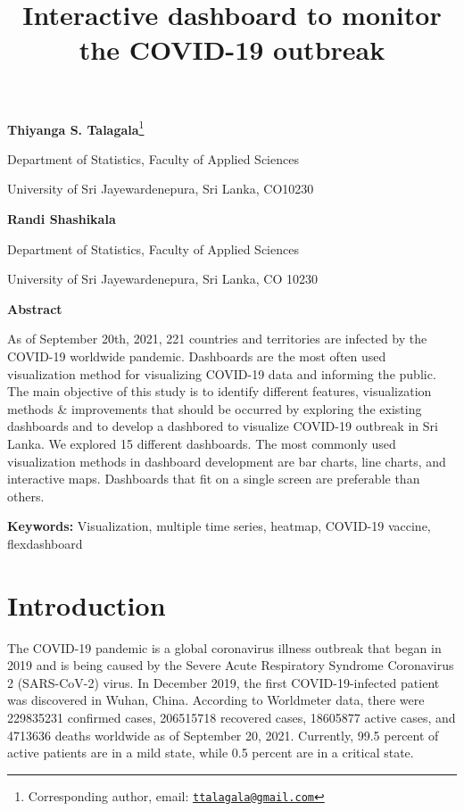 \documentclass[
]{article}
\title{Interactive dashboard to monitor the COVID-19 outbreak}
\author{}
\date{\vspace{-2.5em}}
\begin{document}
\maketitle

\textbf{Thiyanga S. Talagala}\footnote{Corresponding author, email:
  \href{mailto:ttalagala@gmail.com}{\nolinkurl{ttalagala@gmail.com}}}

Department of Statistics, Faculty of Applied Sciences

University of Sri Jayewardenepura, Sri Lanka, CO10230

\hspace{3cm}

\textbf{Randi Shashikala}

Department of Statistics, Faculty of Applied Sciences

University of Sri Jayewardenepura, Sri Lanka, CO 10230

\hspace{3cm}

\textbf{Abstract}

As of September 20th, 2021, 221 countries and territories are infected
by the COVID-19 worldwide pandemic. Dashboards are the most often used
visualization method for visualizing COVID-19 data and informing the
public. The main objective of this study is to identify different
features, visualization methods \& improvements that should be occurred
by exploring the existing dashboards and to develop a dashbored to
visualize COVID-19 outbreak in Sri Lanka. We explored 15 different
dashboards. The most commonly used visualization methods in dashboard
development are bar charts, line charts, and interactive maps.
Dashboards that fit on a single screen are preferable than others.

\textbf{Keywords:} Visualization, multiple time series, heatmap,
COVID-19 vaccine, flexdashboard

\hypertarget{introduction}{%
\section{Introduction}\label{introduction}}

The COVID-19 pandemic is a global coronavirus illness outbreak that
began in 2019 and is being caused by the Severe Acute Respiratory
Syndrome Coronavirus 2 (SARS-CoV-2) virus. In December 2019, the first
COVID-19-infected patient was discovered in Wuhan, China. According to
Worldmeter data, there were 229835231 confirmed cases, 206515718
recovered cases, 18605877 active cases, and 4713636 deaths worldwide as
of September 20, 2021. Currently, 99.5 percent of active patients are in
a mild state, while 0.5 percent are in a critical state.
\end{document}
